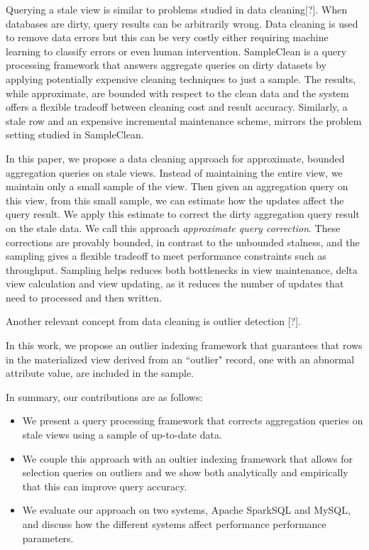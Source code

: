 Querying a stale view is similar to problems studied in data cleaning{[}?{]}.
When databases are dirty, query results can be arbitrarily wrong.
Data cleaning is used to remove data errors but this can be very costly either 
requiring machine learning to classify errors or even human intervention.
SampleClean is a query processing framework that answers aggregate
queries on dirty datasets by applying potentially expensive cleaning
techniques to just a sample. The results, while approximate, are bounded
with respect to the clean data and the system offers a flexible tradeoff
between cleaning cost and result accuracy. Similarly, a stale row
and an expensive incremental maintenance scheme, mirrors the problem
setting studied in SampleClean. 

In this paper, we propose a data cleaning approach for approximate,
bounded aggregation queries on stale views. Instead of maintaining
the entire view, we maintain only a small sample of the view. Then
given an aggregation query on this view, from this small sample, we
can estimate how the updates affect the query result. We apply this
estimate to correct the dirty aggregation query result on the stale
data. We call this approach \emph{approximate query correction}. 
These corrections are provably bounded, in contrast to the unbounded stalness,
and the sampling gives a flexible tradeoff to meet performance constraints such as throughput.
Sampling helps reduces both bottlenecks in view maintenance, delta
view calculation and view updating, as it reduces the number of updates
that need to processed and then written.

Another relevant concept from data cleaning is outlier detection {[}?{]}.

In this work, we propose an outlier indexing framework that guarantees that
rows in the materialized view derived from an ``outlier" record, one with
an abnormal attribute value, are included in the sample.

In summary, our contributions are as follows:
\begin{itemize}
\item We present a query processing framework that corrects aggregation queries on stale
views using a sample of up-to-date data.
\item We couple this approach with an oultier indexing framework that allows
for selection queries on outliers and we show both analytically and empirically that 
this can improve query accuracy.
\item We evaluate our approach on two systems, Apache SparkSQL and MySQL,
and discuss how the different systems affect performance performance
parameters.
\end{itemize}
\fi
